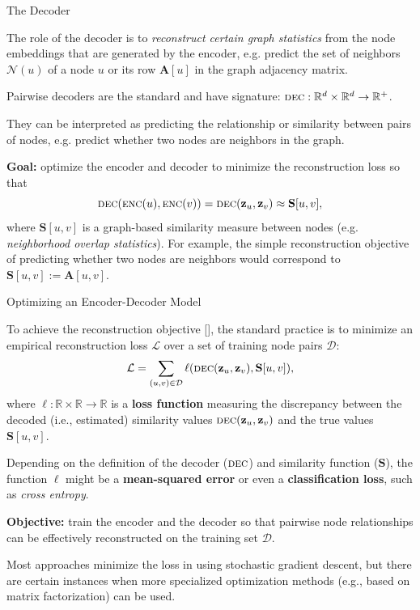 \documentclass[10pt, aspectratio=169, compress, protectframetitle, handout]{beamer}
\begin{document}
\begin{frame}{The Decoder}

    The role of the \alert{decoder} is to \emph{reconstruct certain graph statistics} from the node embeddings that are generated by the encoder, e.g. predict the set of neighbors $\mathcal N(u)$ of a node $u$ or its row $\mathbf A[u]$ in the graph adjacency matrix.
    
    \alert{Pairwise decoders} are the standard and have signature: $\textsc{dec}: \mathbb R^d \times \mathbb R^d \rightarrow \mathbb R^+$.
    
    They can be interpreted as predicting the relationship or similarity between pairs of nodes, e.g. predict whether two nodes are neighbors in the graph.
    
    \textbf{Goal:} optimize the encoder and decoder to minimize the \alert{reconstruction loss} so that
    \begin{equation}
        \textsc{dec}(\textsc{enc}(u), \textsc{enc}(v)) = \textsc{dec}(\mathbf z_u, \mathbf z_v) \approx \mathbf S[u, v],
        \label{eq:reconstrloss}
    \end{equation}
    where $\mathbf S[u, v]$ is a graph-based similarity measure between nodes (e.g. \emph{neighborhood overlap statistics}). For example, the simple reconstruction objective of predicting whether two nodes are neighbors would correspond to $\mathbf S[u, v] := \mathbf A[u, v]$.
        
\end{frame}


\begin{frame}{Optimizing an Encoder-Decoder Model}

    To achieve the reconstruction objective [], the standard practice is to minimize an \alert{empirical reconstruction loss} $\mathcal L$ over a set of training node pairs $\mathcal D$:
    \begin{equation}
        \mathcal L = \sum_{(u,v) \in \mathcal D} \ell (\textsc{dec}(\mathbf z_u, \mathbf z_v), \mathbf S[u, v]),
        \label{eq:loss}
    \end{equation}
    where $\ell: \mathbb R \times \mathbb R \rightarrow \mathbb R$ is a \textbf{loss function} measuring the discrepancy between the decoded (i.e., estimated) similarity values $\textsc{dec}(\mathbf z_u, \mathbf z_v)$ and the true values $\mathbf S[u, v]$.
    
    Depending on the definition of the decoder ($\textsc{dec}$) and similarity function ($\mathbf S$), the function $\ell$ might be a \textbf{mean-squared error} or even a \textbf{classification loss}, such as \emph{cross entropy}.
    
    \textbf{Objective:} \alert{train} the encoder and the decoder so that pairwise node relationships can be effectively reconstructed on the training set $\mathcal D$.
    
    Most approaches minimize the loss in  using \alert{stochastic gradient descent}, but there are certain instances when more specialized optimization methods (e.g., based on matrix factorization) can be used.
    
\end{frame}
\end{document}
